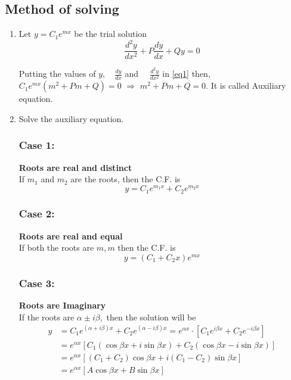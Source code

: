\subsection{Method of solving}
\begin{enumerate}
	\item Let $y=C_{1} e^{m x}$ be the trial solution
	\begin{equation}
	\frac{d^{2} y}{d x^{2}}+P \frac{d y}{d x}+Q y=0\label{eq1}
	\end{equation}
	
	Putting the values of $y,\quad \frac{d y}{d x}$ and $\quad\frac{d^{2} y}{d x^{2}}$ in  \ref{eq1} then,\\ $C_{1} e^{m x}\left(m^{2}+P m+Q\right)=0$
	$\Rightarrow$
	$m^{2}+P m+Q=0 .$ It is called Auxiliary equation.
	\item Solve the auxiliary equation.
	\subsubsection{{Case 1:}}\textbf{ Roots are real and distinct}\\
	If $m_{1}$ and $m_{2}$ are the roots, then the C.F. is
	$$
	y=C_{1} e^{m_{1} x}+C_{2} e^{m_{2} x}
	$$
	\subsubsection{{Case 2:}}\textbf{ Roots are real and  equal}\\
	If both the roots are $m, m$ then the C.F. is
	$$
	y=\left(C_{1}+C_{2} x\right) e^{m x}
	$$
	\subsubsection{{Case 3:}}\textbf{ Roots are Imaginary}\\
	 If the roots are $\alpha \pm i \beta,$ then the solution will be
	$$
	\begin{aligned}
	y &=C_{1} e^{(\alpha+i \beta) x}+C_{2} e^{(\alpha-i \beta) x}=e^{\alpha x} \cdot\left[C_{1} e^{i \beta x}+C_{2} e^{-i \beta x}\right] \\
	&=e^{\alpha x}\left[C_{1}(\cos \beta x+i \sin \beta x)+C_{2}(\cos \beta x-i \sin \beta x)\right] \\
	&=e^{\alpha x}\left[\left(C_{1}+C_{2}\right) \cos \beta x+i\left(C_{1}-C_{2}\right) \sin \beta x\right]\\&=e^{\alpha x}[A \cos \beta x+B \sin \beta x]
	\end{aligned}
	$$
\end{enumerate}
